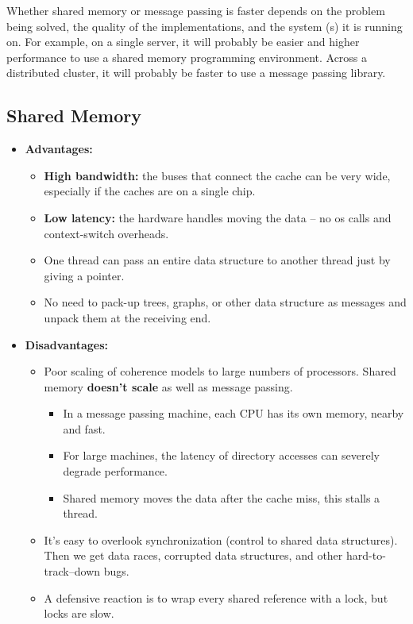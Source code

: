 \documentclass[../main.tex]{subfiles}
\begin{document}
Whether shared memory or message passing is faster depends on the problem being solved, the quality of the implementations, and the system (s) it is running on. For example, on a single server, it will probably be easier and higher performance to use a shared memory programming environment. Across a distributed cluster, it will probably be faster to use a message passing library.

\subsection{Shared Memory}

\begin{itemize}
	\item \textbf{Advantages:}
	      \begin{itemize}
		      \item \textbf{High bandwidth:} the buses that connect the cache can be very wide, especially if the caches are on a single chip.
		      \item \textbf{Low latency:} the hardware handles moving the data -- no os calls and context-switch overheads.
		      \item One thread can pass an entire data structure to another thread just by giving a pointer.
		      \item No need to pack-up trees, graphs, or other data structure as messages and unpack them at the receiving end.
	      \end{itemize}
	\item \textbf{Disadvantages:}
	      \begin{itemize}
		      \item Poor scaling of coherence models to large numbers of processors.
		            Shared memory \textbf{doesn't scale} as well as message passing.
		            \begin{itemize}
			            \item In a message passing machine, each CPU has its own memory, nearby and fast.
			            \item For large machines, the latency of directory accesses can severely degrade performance.
			            \item Shared memory moves the data after the cache miss, this stalls a thread.
		            \end{itemize}
		      \item It's easy to overlook synchronization (control to shared data structures). Then we get data races, corrupted data structures, and other hard-to-track--down bugs.
		      \item A defensive reaction is to wrap every shared reference with a lock, but locks are slow.
	      \end{itemize}
\end{itemize}
\end{document}
